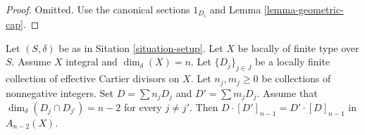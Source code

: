 \begin{proof}
Omitted. Use the canonical sections $1_{D_i}$ and
Lemma \ref{lemma-geometric-cap}.
\end{proof}

\begin{lemma}
\label{lemma-commutativity-effective-Cartier-proper-intersection-inifinite}
Let $(S, \delta)$ be as in Sitation \ref{situation-setup}.
Let $X$ be locally of finite type over $S$.
Assume $X$ integral and $\dim_\delta(X) = n$.
Let $\{D_j\}_{j \in J}$ be a locally finite collection of
effective Cartier divisors on $X$. Let $n_j, m_j \geq 0$ be
collections of nonnegative integers. Set
$D = \sum n_j D_j$ and $D' = \sum m_j D_j$.
Assume that $\dim_\delta(D_j \cap D_{j'}) = n - 2$ for every
$j \not = j'$. Then $D \cdot [D']_{n - 1} = D' \cdot [D]_{n - 1}$ in
$A_{n - 2}(X)$.
\end{lemma}

